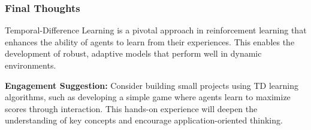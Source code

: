 \documentclass[aspectratio=169]{beamer}
\begin{document}
\begin{frame}[fragile]
    \frametitle{Final Thoughts}
    Temporal-Difference Learning is a pivotal approach in reinforcement learning that enhances the ability of agents to learn from their experiences. This enables the development of robust, adaptive models that perform well in dynamic environments.

    \textbf{Engagement Suggestion:}  
    Consider building small projects using TD learning algorithms, such as developing a simple game where agents learn to maximize scores through interaction. This hands-on experience will deepen the understanding of key concepts and encourage application-oriented thinking.
\end{frame}
\end{document}
